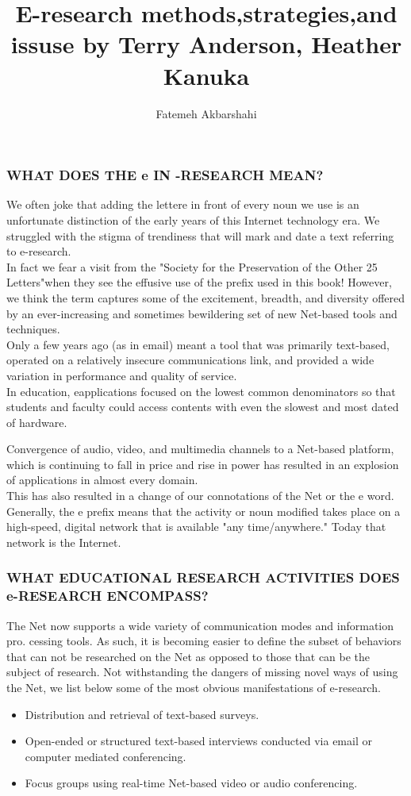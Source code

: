\documentclass{beamer}
\title{E-research methods,strategies,and issuse by Terry Anderson, Heather Kanuka}
\author{Fatemeh Akbarshahi}
\begin{document}
  {%
    \frame{\titlepage}
  }

  \begin{frame}
\frametitle{WHAT DOES THE e IN -RESEARCH MEAN?}
We often joke that adding the lettere in front of every noun we use is an unfortunate distinction of the early years of this Internet technology era. We struggled with the stigma of trendiness that will mark and date a text referring to e-research.\\
 In fact we fear a visit from the "Society for the Preservation of the Other 25 Letters"when they see the effusive use of the prefix used in this book! However, we think the term captures some of the excitement, breadth, and diversity offered by an ever-increasing and sometimes bewildering set of new Net-based tools and techniques.\\
  Only a few years ago (as in email) meant a tool that was primarily text-based, operated on a relatively insecure communications link,
and provided a wide variation in performance and quality of service.\\
 In education, eapplications focused on the lowest common denominators so that students and faculty
could access contents with even the slowest and most dated of hardware. 
  \end{frame}
    \begin{frame}
Convergence  of audio, video, and multimedia channels to a Net-based platform, which is continuing
to fall in price and rise in power has resulted in an explosion of applications in almost every domain.\\
 This has also resulted in a change of our connotations of the Net or the e word. Generally, the e prefix means that the activity or noun modified takes place on a high-speed, digital network that is available "any time/anywhere." Today that network is
the Internet.    
  \end{frame}
  
    \begin{frame}
\frametitle{WHAT EDUCATIONAL RESEARCH ACTIVITIES DOES e-RESEARCH
ENCOMPASS?}  
The Net now supports a wide variety of communication modes and information pro.
cessing tools. As such, it is becoming easier to define the subset of behaviors that can not
be researched on the Net as opposed to those that can be the subject of research. Not
withstanding the dangers of missing novel ways of using the Net, we list below some of
the most obvious manifestations of e-research.
\begin{itemize}
 \item
  Distribution and retrieval of text-based surveys.
  \item
  Open-ended or structured text-based interviews conducted via email or computer
mediated conferencing.
\item
Focus groups using real-time Net-based video or audio conferencing.
\end{itemize}
  \end{frame}
  
\end{document}
